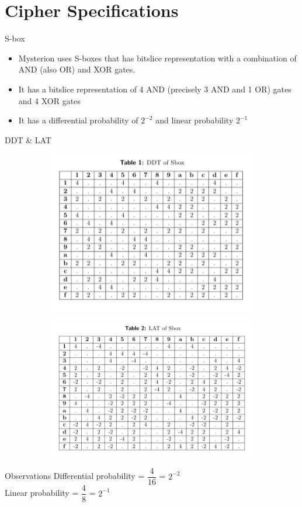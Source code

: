 \section{Cipher Specifications}

\begin{frame}{S-box}

\begin{itemize}
    \item Mysterion uses S-boxes that has bitslice representation with a combination of AND (also OR) and XOR gates. 
    \item It has a bitslice representation of 4 AND (precisely 3 AND and 1 OR) gates and 4 XOR gates
    \item It has a  differential probability of $2^{-2}$ and linear probability $2^{-1}$
\end{itemize}
\end{frame}

\begin{frame}{DDT \& LAT}
    \begin{figure}
    \centering
    \begin{subfigure}{}
      \centering
      \includegraphics[scale=0.37]{DDT.png}
      \label{fig:sub1}
    \end{subfigure}%
    \begin{subfigure}{}
      \centering
      \includegraphics[scale=0.38]{LAT.png}
      \label{fig:sub2}
    \end{subfigure}
    \label{fig:test}
    \end{figure}
    \begin{block} {Observations}
    Differential probability = $\dfrac{4}{16}$ = $2^{-2}$ \\
    Linear probability = $\dfrac{4}{8}$ = $2^{-1}$ 
    \end{block}
\end{frame}

